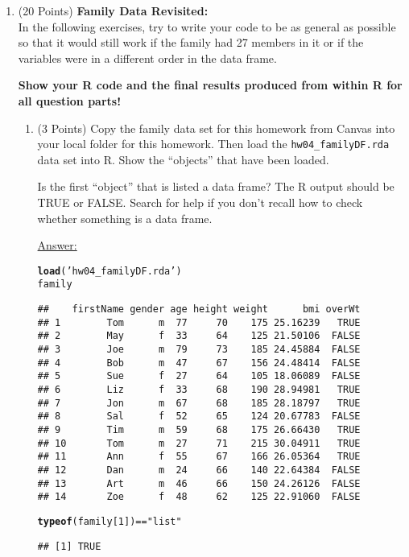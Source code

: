 \documentclass[12pt,letterpaper,final]{article}\usepackage[]{graphicx}\usepackage[]{xcolor}
\makeatletter
\newcommand{\hlnum}[1]{\textcolor[rgb]{0.686,0.059,0.569}{#1}}%
\newcommand{\hlstr}[1]{\textcolor[rgb]{0.192,0.494,0.8}{#1}}%
\newcommand{\hlopt}[1]{\textcolor[rgb]{0,0,0}{#1}}%
\newcommand{\hlstd}[1]{\textcolor[rgb]{0.345,0.345,0.345}{#1}}%
\newcommand{\hlkwd}[1]{\textcolor[rgb]{0.737,0.353,0.396}{\textbf{#1}}}%
\newenvironment{kframe}{%
 \def\at@end@of@kframe{}%
 \ifinner\ifhmode%
  \def\at@end@of@kframe{\end{minipage}}%
  \begin{minipage}{\columnwidth}%
 \fi\fi%
 \def\FrameCommand##1{\hskip\@totalleftmargin \hskip-\fboxsep
 \colorbox{shadecolor}{##1}\hskip-\fboxsep
     \hskip-\linewidth \hskip-\@totalleftmargin \hskip\columnwidth}%
 \MakeFramed {\advance\hsize-\width
   \@totalleftmargin\z@ \linewidth\hsize
   \@setminipage}}%
 {\par\unskip\endMakeFramed%
 \at@end@of@kframe}
\newenvironment{knitrout}{}{} %
\makeatother
\begin{document}
\begin{enumerate}

\item (20 Points) {\bf Family Data Revisited:} \\
In the following exercises, try to write your code to be as general as possible
so that it would still work if the family had 27 members in it or if the 
variables were in a different order in the data frame.

{\bf Show your R code and the final results produced from within R
for all question parts!}


\begin{enumerate}
\item (3 Points)
Copy the family data set for this homework from Canvas into your local folder for this homework.
Then load the \verb|hw04_familyDF.rda| data set into R. Show the ``objects'' that have been loaded.

Is the first ``object'' that is listed a data frame? The R output should be TRUE or FALSE.
Search for help if you don't recall how
to check whether something is a data frame.

\underline{Answer:}
\begin{knitrout}
\color{fgcolor}\begin{kframe}
\begin{alltt}
\hlkwd{load}\hlstd{(}\hlstr{'hw04_familyDF.rda'}\hlstd{)}
\hlstd{family}
\end{alltt}
\begin{verbatim}
##    firstName gender age height weight      bmi overWt
## 1        Tom      m  77     70    175 25.16239   TRUE
## 2        May      f  33     64    125 21.50106  FALSE
## 3        Joe      m  79     73    185 24.45884  FALSE
## 4        Bob      m  47     67    156 24.48414  FALSE
## 5        Sue      f  27     64    105 18.06089  FALSE
## 6        Liz      f  33     68    190 28.94981   TRUE
## 7        Jon      m  67     68    185 28.18797   TRUE
## 8        Sal      f  52     65    124 20.67783  FALSE
## 9        Tim      m  59     68    175 26.66430   TRUE
## 10       Tom      m  27     71    215 30.04911   TRUE
## 11       Ann      f  55     67    166 26.05364   TRUE
## 12       Dan      m  24     66    140 22.64384  FALSE
## 13       Art      m  46     66    150 24.26126  FALSE
## 14       Zoe      f  48     62    125 22.91060  FALSE
\end{verbatim}
\begin{alltt}
\hlkwd{typeof}\hlstd{(family[}\hlnum{1}\hlstd{])} \hlopt{==} \hlstr{"list"}
\end{alltt}
\begin{verbatim}
## [1] TRUE
\end{verbatim}
\end{kframe}
\end{knitrout}



\end{enumerate}
\end{enumerate}
\end{document}
